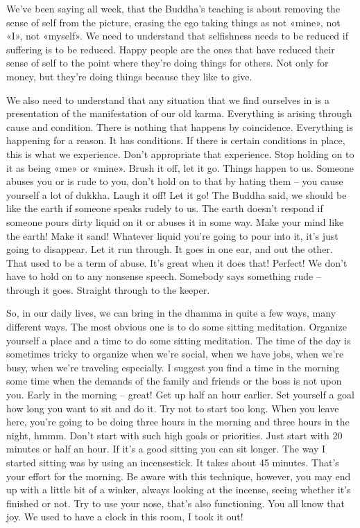 \documentclass[letterpaper,10pt,english]{sphinxmanual}
\begin{document}
\sphinxAtStartPar
We’ve  been  saying  all  week,  that  the  Buddha’s  teaching  is  about
removing the sense of self from the picture, erasing the ego taking things as
not «mine», not «I», not «myself». We need to understand that selfishness
needs to be reduced if suffering is to be reduced. Happy people are the ones
that have reduced their sense of self to the point where they’re doing things
for others. Not only for money, but they’re doing things because they like
to give.

\sphinxAtStartPar
We also need to understand that any situation that we find ourselves in
is a presentation of the manifestation of our old karma. Everything is arising
through cause and condition. There is nothing that happens by coincidence.
Everything  is  happening  for  a  reason.  It  has  conditions.  If  there  is  certain
conditions in place, this is what we experience. Don’t appropriate that experience. Stop holding on to it as being «me» or «mine». Brush it off, let it go.
Things happen to us. Someone abuses you or is rude to you, don’t hold on
to that by hating them – you cause yourself a lot of dukkha. Laugh it off!
Let it go! The Buddha said, we should be like the earth if someone speaks
rudely  to  us.  The  earth  doesn’t  respond  if  someone  pours  dirty  liquid  on
it or abuses it in some way. Make your mind like the earth! Make it sand!
Whatever liquid you’re going to pour into it, it’s just going to disappear. Let
it run through. It goes in one ear, and out the other. That used to be a term
of abuse. It’s great when it does that! Perfect! We don’t have to hold on to
any  non\sphinxhyphen{}sense  speech.  Somebody  says  something  rude  –  through  it  goes.
Straight through to the keeper.

\sphinxAtStartPar
So, in our daily lives, we can bring in the dhamma in quite a few ways,
many different ways. The most obvious one is to do some sitting meditation.
Organize yourself a place and a time to do some sitting meditation. The time
of the day is sometimes tricky to organize when we’re social, when we have
jobs, when we’re busy, when we’re traveling especially. I suggest you find a
time in the morning some time when the demands of the family and friends
or the boss is not upon you. Early in the morning – great! Get up half an
hour earlier. Set yourself a goal how long you want to sit and do it. Try not to
start too long. When you leave here, you’re going to be doing three hours in
the morning and three hours in the night, hmmm. Don’t start with such high
  goals or priorities. Just start with 20 minutes or half an hour. If it’s a good
sitting you can sit longer. The way I started sitting was by using an incensestick. It takes about 45 minutes. That’s your effort for the morning. Be aware
with this technique, however, you may end up with a little bit of a winker,
always looking at the incense, seeing whether it’s finished or not. Try to use
your nose, that’s also functioning. You all know that joy. We used to have a
clock in this room, I took it out!
\end{document}

